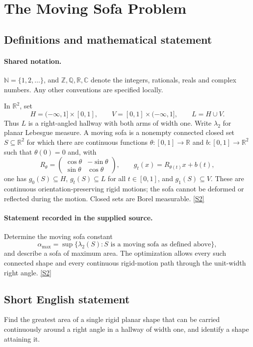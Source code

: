 \documentclass[11pt]{article}
\newcommand{\sref}[2]{\hyperlink{source:#1:#2}{[S#2]}}
\begin{document}
\section{The Moving Sofa Problem}\label{statement}

\subsection{Definitions and mathematical statement}

\paragraph{Shared notation.}$\mathbb N=\{1,2,\ldots\}$, and $\mathbb Z,\mathbb Q,\mathbb R,\mathbb C$ denote the integers, rationals, reals and complex numbers. Any other conventions are specified locally.


In $\mathbb R^2$, set
\[
 H=(-\infty,1]\times[0,1],\qquad
 V=[0,1]\times(-\infty,1],\qquad L=H\cup V.
\]
Thus $L$ is a right-angled hallway with both arms of width one. Write $\lambda_2$ for planar Lebesgue measure. A moving sofa is a nonempty connected closed set $S\subseteq\mathbb R^2$ for which there are continuous functions $\theta:[0,1]\to\mathbb R$ and $b:[0,1]\to\mathbb R^2$ such that $\theta(0)=0$ and, with
\[
 R_\theta=\begin{pmatrix}\cos\theta&-\sin\theta\\ \sin\theta&\cos\theta\end{pmatrix},
 \qquad g_t(x)=R_{\theta(t)}x+b(t),
\]
one has $g_0(S)\subseteq H$, $g_t(S)\subseteq L$ for all $t\in[0,1]$, and $g_1(S)\subseteq V$. These are continuous orientation-preserving rigid motions; the sofa cannot be deformed or reflected during the motion. Closed sets are Borel measurable. \sref{statement}{2}
\paragraph{Statement recorded in the supplied source.}
Determine the moving sofa constant
\[
 \alpha_{\max}=\sup\{\lambda_2(S): S\text{ is a moving sofa as defined above}\},
\]
and describe a sofa of maximum area. The optimization allows every such connected shape and every continuous rigid-motion path through the unit-width right angle. \sref{statement}{2}
\subsection{Short English statement}
Find the greatest area of a single rigid planar shape that can be carried continuously around a right angle in a hallway of width one, and identify a shape attaining it.
\end{document}
